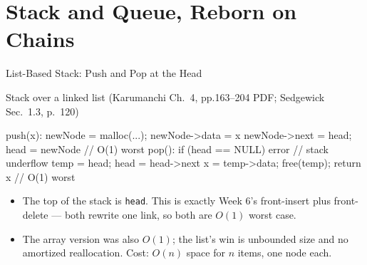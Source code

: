 \documentclass[aspectratio=169]{beamer}
\begin{document}

\section{Stack and Queue, Reborn on Chains}


\begin{frame}[fragile]{List-Based Stack: Push and Pop at the Head}
  \begin{block}{Stack over a linked list (Karumanchi Ch.~4, pp.163--204 PDF;
    Sedgewick Sec.~1.3, p.~120)
    \cite{Karumanchi2017_data_structures_algorithms_made_easy,Sedgewick2011_algorithms}}
\begin{semiverbatim}
push(x): newNode = malloc(...); newNode->data = x
         newNode->next = head; head = newNode      // O(1) worst
pop():   if (head == NULL) error                  // stack underflow
         temp = head; head = head->next
         x = temp->data; free(temp); return x      // O(1) worst
\end{semiverbatim}
  \end{block}
  \begin{itemize}
    \item The top of the stack is \texttt{head}. This is exactly Week 6's
      front-insert plus front-delete --- both rewrite one link, so both are
      $O(1)$ worst case.
    \item The array version was also $O(1)$; the list's win is unbounded size
      and no amortized reallocation. Cost: $O(n)$ space for $n$ items, one
      node each.
  \end{itemize}
\end{frame}
\end{document}

